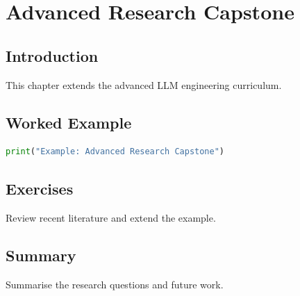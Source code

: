\chapter{Advanced Research Capstone}
\label{chap:vol13-10}



\section{Introduction}
This chapter extends the advanced LLM engineering curriculum.

\section{Worked Example}
\begin{lstlisting}[language=Python]
print("Example: Advanced Research Capstone")
\end{lstlisting}

\section{Exercises}
\begin{exercise}
Review recent literature and extend the example.
\end{exercise}

\section{Summary}
Summarise the research questions and future work.
